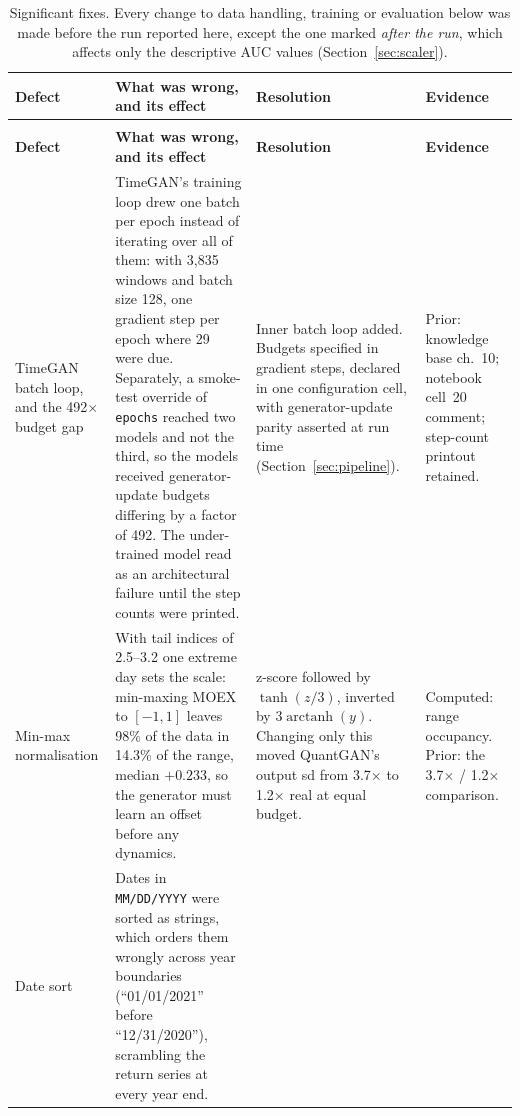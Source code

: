 \documentclass[11pt,a4paper]{article}
\makeatletter
\DeclareRobustCommand{\_}{\ifmmode\nfss@text{\textunderscore}\else\textunderscore\allowbreak\fi}
\makeatother
\begin{document}
{\footnotesize
\setlength{\tabcolsep}{4pt}
\begin{xltabular}{\linewidth}{@{}>{\raggedright\arraybackslash}p{3.0cm} >{\raggedright\arraybackslash}X >{\raggedright\arraybackslash}p{3.3cm} >{\raggedright\arraybackslash}p{2.6cm}@{}}
\caption{Significant fixes. Every change to data handling, training or evaluation below was made before the run reported here, except the one marked \emph{after the run}, which affects only the descriptive AUC values (Section~\ref{sec:scaler}).}\label{tab:fixes}\\
\toprule
\bfseries Defect & \bfseries What was wrong, and its effect & \bfseries Resolution & \bfseries Evidence \\
\midrule
\endfirsthead
{}\\
\toprule
\bfseries Defect & \bfseries What was wrong, and its effect & \bfseries Resolution & \bfseries Evidence \\
\midrule
\endhead
\bottomrule
\endfoot
TimeGAN batch loop, and the 492$\times$ budget gap &
TimeGAN's training loop drew one batch per epoch instead of iterating over all of them: with 3{,}835 windows and batch size 128, one gradient step per epoch where 29 were due. Separately, a smoke-test override of \texttt{epochs} reached two models and not the third, so the models received generator-update budgets differing by a factor of 492. The under-trained model read as an architectural failure until the step counts were printed. &
Inner batch loop added. Budgets specified in gradient steps, declared in one configuration cell, with generator-update parity asserted at run time (Section~\ref{sec:pipeline}). &
Prior: knowledge base ch.~10; notebook cell~20 comment; step-count printout retained. \\
\addlinespace
Min-max normalisation &
With tail indices of 2.5--3.2 one extreme day sets the scale: min-maxing MOEX to $[-1,1]$ leaves 98\% of the data in 14.3\% of the range, median $+0.233$, so the generator must learn an offset before any dynamics. &
z-score followed by $\tanh(z/3)$, inverted by $3\operatorname{arctanh}(y)$. Changing only this moved QuantGAN's output sd from 3.7$\times$ to 1.2$\times$ real at equal budget. &
Computed: range occupancy. Prior: the 3.7$\times$ / 1.2$\times$ comparison. \\
\addlinespace
Date sort &
Dates in \texttt{MM/DD/YYYY} were sorted as strings, which orders them wrongly across year boundaries (``01/01/2021'' before ``12/31/2020''), scrambling the return series at every year end. &

\end{xltabular}}
\end{document}
